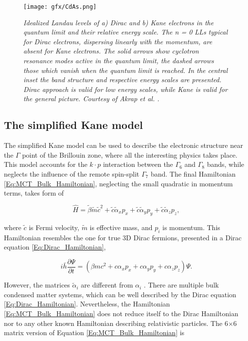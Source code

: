\documentclass[titlepage,a4paper]{book}
\newcommand{\wciecie}{\quad\phantom{v}}
\begin{document}
\begin{figure}[ht]
	\centering
	\texttt{[image: gfx/CdAs.png]}
	\vspace{-10pt}
	\caption{\textit{Idealized Landau levels of a) Dirac and b) Kane electrons in the quantum limit and their relative energy scale. The n = 0 LLs typical for Dirac electrons, dispersing linearly with the momentum, are absent for Kane electrons. The solid arrows show cyclotron resonance modes active in the quantum limit, the dashed arrows those which vanish when the quantum limit is reached. In the central inset the band structure and respective energy scales are presented. Dirac approach is valid for low energy scales, while Kane is valid for the general picture. Courtesy of Akrap et al. \cite{Akrap_CdAs}.}}
	\label{fig:CdAs_bandStructure}
\end{figure} 

\subsection{The simplified Kane model}
\wciecie
The simplified Kane model \cite{Kane_MCT}\cite{Kane_Model} can be used to describe the electronic structure near the $\Gamma$ point of the Brillouin zone, where all the interesting physics takes place. This model accounts for the $k\cdot p$ interaction between the $\Gamma_6$ and $\Gamma_8$ bands, while neglects the influence of the remote spin-split $\Gamma_7$ band. The final Hamiltonian \ref{Eq:MCT_Bulk_Hamiltonian}, neglecting the small quadratic in momentum terms, takes form of

\begin{equation}
\label{Eq:MCT_Bulk_Hamiltonian}
\hat{H} = \tilde{\beta} \tilde{m}\tilde{c}^2 + \tilde{c}\tilde{\alpha}_x p_x + \tilde{c}\tilde{\alpha}_y p_y + \tilde{c}\tilde{\alpha}_z p_z ,
\end{equation}

where $\tilde{c}$ is Fermi velocity, $\tilde{m}$ is effective mass, and $p_i$ is momentum. This Hamiltonian resembles the one for true 3D Dirac fermions, presented in a Dirac equation \ref{Eq:Dirac_Hamiltonian}, 

\begin{equation}
\label{Eq:Dirac_Hamiltonian}
i\bar{h} \frac{\partial \Psi}{\partial t} = \left( \beta mc^2 + c\alpha_x p_x + c\alpha_y p_y + c\alpha_z p_z \right) \Psi.
\end{equation}

However, the matrices $\tilde{\alpha}_i$ are different from $\alpha_i$ \cite{Teppe_MCT}. There are multiple bulk condensed matter systems, which can be well described by the Dirac equation \ref{Eq:Dirac_Hamiltonian}. Nevertheless, the Hamiltonian \ref{Eq:MCT_Bulk_Hamiltonian} does not reduce itself to the Dirac Hamiltonian nor to any other known Hamiltonian describing relativistic particles. The 6$\times$6 matrix version of Equation \ref{Eq:MCT_Bulk_Hamiltonian} is
\end{document}
